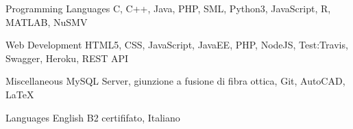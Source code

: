 

\begin{cvskills}

  \cvskill
    {Programming Languages} %
    {C, C++, Java, PHP, SML, Python3, JavaScript, R, MATLAB, NuSMV} %

  \cvskill
    {Web Development} %
    {HTML5, CSS, JavaScript, JavaEE, PHP, NodeJS, Test:Travis, Swagger, Heroku, REST API} %

  \cvskill
    {Miscellaneous} %
    {MySQL Server, giunzione a fusione di fibra ottica, Git, AutoCAD, LaTeX} %

  \cvskill
    {Languages} %
    {English B2 certififato, Italiano} %

\end{cvskills}
